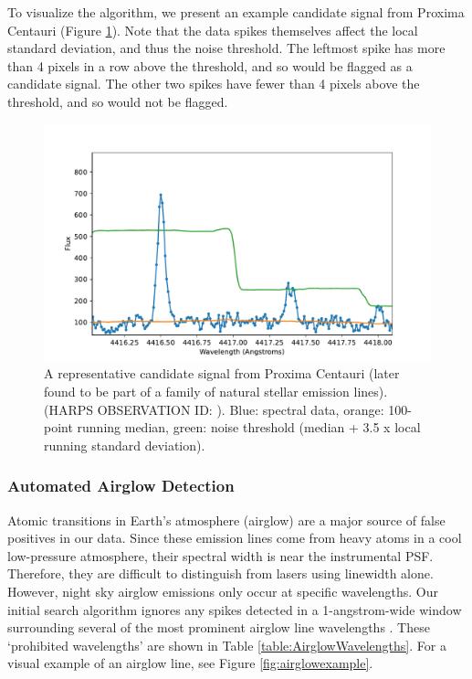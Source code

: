 \documentclass[twocolumn]{aastex701}
\begin{document}
To visualize the algorithm, we present an example candidate signal from Proxima Centauri (Figure \ref{fig:algorithm-example}).  Note that the data spikes themselves affect the local standard deviation, and thus the noise threshold. The leftmost spike has more than 4 pixels in a row above the threshold, and so would be flagged as a candidate signal. The other two spikes have fewer than 4 pixels above the threshold, and so would not be flagged.

\begin{figure}
    \centering
\includegraphics[width=\columnwidth]{proxima_algorithm_example4.pdf}
    \caption{A representative  candidate signal from Proxima Centauri (later found to be part of a family of natural stellar emission lines). (HARPS OBSERVATION ID: ). Blue: spectral data, orange: 100-point running median, green: noise threshold (median + 3.5 x local running standard deviation).}
    \label{fig:algorithm-example}
\end{figure}

\subsubsection{Automated Airglow Detection}
\label{s:Airglow}
Atomic transitions in Earth's atmosphere (airglow) are a major source of false positives in our data.  Since these emission lines come from heavy atoms in a cool low-pressure atmosphere, their spectral width is near the instrumental PSF. Therefore, they are difficult to distinguish from lasers using linewidth alone. However, night sky airglow emissions only occur at specific wavelengths. Our initial search algorithm ignores any spikes detected in a 1-angstrom-wide window surrounding several of the most prominent airglow line wavelengths \citep{Luger_2017}. These `prohibited wavelengths' are shown in Table \ref{table:AirglowWavelengths}. For a visual example of an airglow line, see Figure \ref{fig:airglowexample}.
\end{document}
